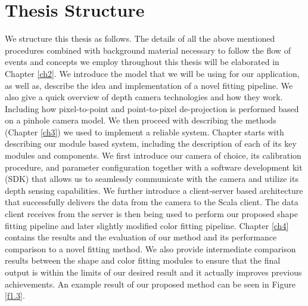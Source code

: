 \section{Thesis Structure}
We structure this thesis as follows. The details of all the above mentioned procedures combined with background material necessary to follow the flow of events and concepts we employ throughout this thesis will be elaborated in Chapter \ref{ch2}. We introduce the model that we will be using for our application, as well as, describe the idea and implementation of a novel fitting pipeline. We also give a quick overview of depth camera technologies and how they work. Including how pixel-to-point and point-to-pixel de-projection is performed based on a pinhole camera model.  We then proceed with describing the methods (Chapter \ref{ch3}) we used to implement a reliable system. Chapter starts with describing our module based system, including the description of each of its key modules and components. We first introduce our camera of choice, its calibration procedure, and parameter configuration together with a software development kit (SDK) that allows us to seamlessly communicate with the camera and utilize its depth sensing capabilities. We further introduce a client-server based architecture that successfully delivers the data from the camera to the Scala client. The data client receives from the server is then being used to perform our proposed shape fitting pipeline and later slightly modified color fitting pipeline. Chapter \ref{ch4} contains the results and the evaluation of our method and its performance comparison to a novel fitting method. We also provide intermediate comparison results between the shape and color fitting modules to ensure that the final output is within the limits of our desired result and it actually improves previous achievements. An example result of our proposed method can be seen in Figure \ref{f1.3}. 

